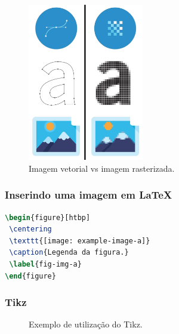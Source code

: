 \begin{frame}
\begin{figure}[h]
 \centering
 \includegraphics[width=0.45\textwidth,height=0.8\textheight,keepaspectratio]{figures/vector-raster.png}
 \caption{Imagem vetorial vs imagem rasterizada.}
 \label{fig-imgvr}
\end{figure}
\end{frame}

\begin{frame}[fragile]
\frametitle{Inserindo uma imagem em \LaTeX{}}
\begin{lstlisting}[language=tex, label=lst-figure, caption={Código para inserir uma figura em \LaTeX{}}, postbreak=\mbox{$\hookrightarrow$\space}, basicstyle=\fontsize{8}{10}\selectfont\ttfamily]
\begin{figure}[htbp]
 \centering
 \texttt{[image: example-image-a]}
 \caption{Legenda da figura.}
 \label{fig-img-a}
\end{figure}
\end{lstlisting}
\end{frame}



\begin{frame}
\frametitle{Tikz}
\begin{figure}[h]
\centering
{}
\caption{Exemplo de utilização do Tikz.}
 \label{fig-tikz}
\end{figure}
\end{frame}


